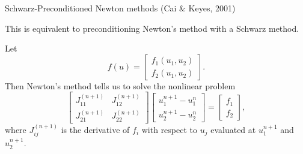 \documentclass{beamer}
\begin{document}
\begin{frame}{Schwarz-Preconditioned Newton methods (Cai \& Keyes, 2001)}

This is equivalent to preconditioning Newton's method with a Schwarz method.

Let
\begin{equation*}
	f(u) = \begin{bmatrix} f_1(u_1, u_2) \\ f_2(u_1,u_2) \end{bmatrix}.
\end{equation*}
Then Newton's method tells us to solve the nonlinear problem
\begin{equation*}
	\begin{bmatrix} J_{11}^{(n+1)} & J_{12}^{(n+1)} \\ J_{21}^{(n+1)} & J_{22}^{(n+1)} \end{bmatrix} \begin{bmatrix} u_1^{n+1} - u_1^n \\ u_2^{n+1} - u_2^n \end{bmatrix} = \begin{bmatrix} f_1 \\ f_2 \end{bmatrix},
\end{equation*}
where $J_{ij}^{(n+1)}$ is the derivative of $f_i$ with respect to $u_j$ evaluated at $u_1^{n+1}$ and $u_2^{n+1}$.
\end{frame}
\end{document}
